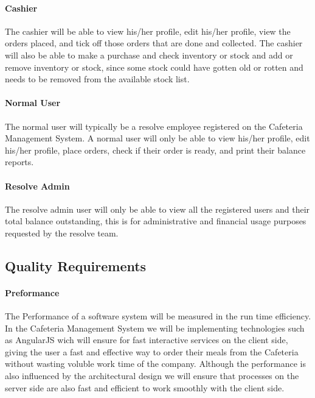 \documentclass[12pt]{article}
\begin{document}
\paragraph{ Cashier\\}
The cashier will be able to view his/her profile, edit his/her profile, view the orders placed, and tick off those orders that are done and collected. The cashier will also be able to make a purchase and check inventory or stock and add or remove inventory or stock, since some stock could have gotten old or rotten and needs to be removed from the available stock list. 

\paragraph{ Normal User\\}
The normal user will typically be a resolve employee registered on the Cafeteria Management System.  A normal user will only be able to view his/her profile, edit his/her profile, place orders, check if their order is ready, and print their balance reports.

\paragraph{ Resolve Admin\\}
The resolve admin user will only be able to view all the registered users and their total balance outstanding, this is for administrative and financial usage purposes requested by the resolve team.



\subsection{Quality Requirements}

\paragraph{ Preformance\\}
The Performance of a software system will be measured in the run time efficiency.  In the Cafeteria Management System we will be implementing technologies such as AngularJS wich will ensure for fast interactive services on the client side, giving the user a fast and effective way to order their meals from the Cafeteria without wasting voluble work time of the company.  Although the performance is also influenced by the architectural design we will ensure that processes on the server side are also fast and efficient to work smoothly with the client side. 
\end{document}
